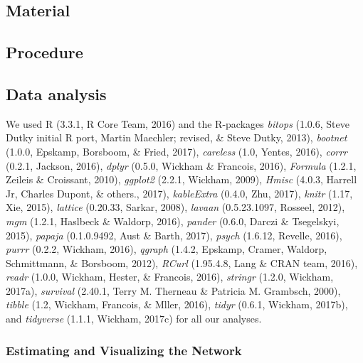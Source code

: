 \documentclass[english,man]{apa6}
\theoremstyle{definition}
\theoremstyle{definition}
\theoremstyle{remark}
\begin{document}
\subsection{Material}\label{material}

\subsection{Procedure}\label{procedure}

\subsection{Data analysis}\label{data-analysis}

We used R (3.3.1, R Core Team, 2016) and the R-packages \emph{bitops}
(1.0.6, Steve Dutky initial R port, Martin Maechler; revised, \& Steve
Dutky, 2013), \emph{bootnet} (1.0.0, Epskamp, Borsboom, \& Fried, 2017),
\emph{careless} (1.0, Yentes, 2016), \emph{corrr} (0.2.1, Jackson,
2016), \emph{dplyr} (0.5.0, Wickham \& Francois, 2016), \emph{Formula}
(1.2.1, Zeileis \& Croissant, 2010), \emph{ggplot2} (2.2.1, Wickham,
2009), \emph{Hmisc} (4.0.3, Harrell Jr, Charles Dupont, \& others.,
2017), \emph{kableExtra} (0.4.0, Zhu, 2017), \emph{knitr} (1.17, Xie,
2015), \emph{lattice} (0.20.33, Sarkar, 2008), \emph{lavaan}
(0.5.23.1097, Rosseel, 2012), \emph{mgm} (1.2.1, Haslbeck \& Waldorp,
2016), \emph{pander} (0.6.0, Darczi \& Tsegelskyi, 2015), \emph{papaja}
(0.1.0.9492, Aust \& Barth, 2017), \emph{psych} (1.6.12, Revelle, 2016),
\emph{purrr} (0.2.2, Wickham, 2016), \emph{qgraph} (1.4.2, Epskamp,
Cramer, Waldorp, Schmittmann, \& Borsboom, 2012), \emph{RCurl}
(1.95.4.8, Lang \& CRAN team, 2016), \emph{readr} (1.0.0, Wickham,
Hester, \& Francois, 2016), \emph{stringr} (1.2.0, Wickham, 2017a),
\emph{survival} (2.40.1, Terry M. Therneau \& Patricia M. Grambsch,
2000), \emph{tibble} (1.2, Wickham, Francois, \& Mller, 2016),
\emph{tidyr} (0.6.1, Wickham, 2017b), and \emph{tidyverse} (1.1.1,
Wickham, 2017c) for all our analyses.

\subsubsection{Estimating and Visualizing the
Network}\label{estimating-and-visualizing-the-network}
\end{document}

